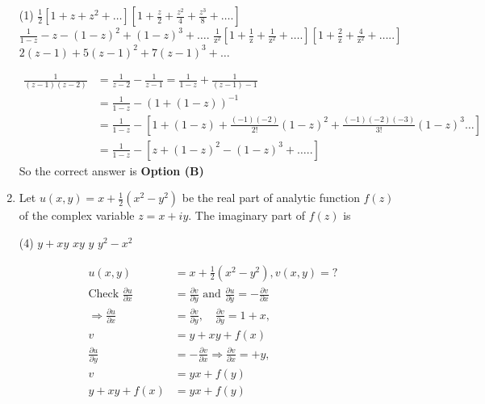 \begin{enumerate}[label=\color{ocre}\textbf{\arabic*.}]
	{}
	\begin{tasks}(1)
		\task[\textbf{A.}] $\frac{1}{2}\left[1+z+z^{2}+\ldots\right]\left[1+\frac{z}{2}+\frac{z^{2}}{4}+\frac{z^{3}}{8}+\ldots .\right]$
		\task[\textbf{B.}] $\frac{1}{1-z}-z-(1-z)^{2}+(1-z)^{3}+\ldots .$
		\task[\textbf{C.}] $\frac{1}{\mathrm{z}^{2}}\left[1+\frac{1}{\mathrm{z}}+\frac{1}{\mathrm{z}^{2}}+\ldots .\right]\left[1+\frac{2}{\mathrm{z}}+\frac{4}{\mathrm{z}^{2}}+\ldots . .\right]$
		\task[\textbf{D.}]  $2(z-1)+5(z-1)^{2}+7(z-1)^{3}+\ldots$
	\end{tasks}
	\begin{answer}
		\begin{align*}
		\frac{1}{(z-1)(z-2)}&=\frac{1}{z-2}-\frac{1}{z-1}=\frac{1}{1-z}+\frac{1}{(z-1)-1}\\&=\frac{1}{1-z}-(1+(1-z))^{-1}\\
		&=\frac{1}{1-z}-\left[1+(1-z)+\frac{(-1)(-2)}{2 !}(1-z)^{2}+\frac{(-1)(-2)(-3)}{3 !}(1-z)^{3} \ldots\right]\\
		&=\frac{1}{1-z}-\left[z+(1-z)^{2}-(1-z)^{3}+\ldots . .\right]
		\end{align*}
		So the correct answer is \textbf{Option (B)}
	\end{answer}
	\item Let $u(x, y)=x+\frac{1}{2}\left(x^{2}-y^{2}\right)$ be the real part of analytic function $f(z)$ of the complex variable $z=x+i y$. The imaginary part of $f(z)$ is
	{}
	\begin{tasks}(4)
		\task[\textbf{A.}] $y+x y$
		\task[\textbf{B.}] $x y$
		\task[\textbf{C.}] $y$
		\task[\textbf{D.}] $y^{2}-x^{2}$
	\end{tasks}
	\begin{answer}
		\begin{align*}
		u(x, y)&=x+\frac{1}{2}\left(x^{2}-y^{2}\right), v(x, y)=?\\
		\text{Check }\frac{\partial u}{\partial x}&=\frac{\partial v}{\partial y}\text{ and } \frac{\partial u}{\partial y}=-\frac{\partial v}{\partial x}\\
		\Rightarrow \frac{\partial u}{\partial x}&=\frac{\partial v}{\partial y}, \quad \frac{\partial v}{\partial y}=1+x, \\ v&=y+x y+f(x)\\
		\frac{\partial u}{\partial y}&=-\frac{\partial v}{\partial x} \Rightarrow \frac{\partial v}{\partial x}=+y, \\ v&=y x+f(y)\\
		y+x y+f(x)&=y x+f(y)\\

\end{align*}
\end{answer}
\end{enumerate}
